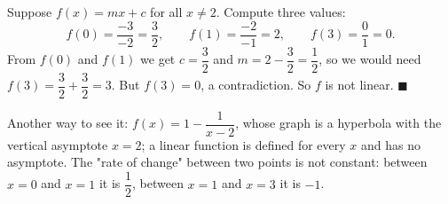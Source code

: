 Suppose $f(x)=mx+c$ for all $x\ne2$. Compute three values:
\[
f(0)=\dfrac{-3}{-2}=\dfrac{3}{2},\qquad f(1)=\dfrac{-2}{-1}=2,\qquad f(3)=\dfrac{0}{1}=0 .
\]
From $f(0)$ and $f(1)$ we get $c=\dfrac{3}{2}$ and $m=2-\dfrac{3}{2}=\dfrac{1}{2}$, so we would need $f(3)=\dfrac{3}{2}+\dfrac{3}{2}=3$. But $f(3)=0$, a contradiction. So $f$ is not linear. $\blacksquare$

Another way to see it: $f(x)=1-\dfrac{1}{x-2}$, whose graph is a hyperbola with the vertical asymptote $x=2$; a linear function is defined for every $x$ and has no asymptote. The "rate of change" between two points is not constant: between $x=0$ and $x=1$ it is $\dfrac{1}{2}$, between $x=1$ and $x=3$ it is $-1$.
